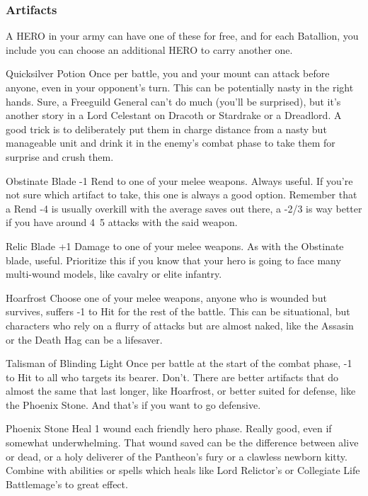 \subsubsection{Artifacts}
A HERO in your army can have one of these for free, and for each Batallion, you
include you can choose an additional HERO to carry another one.

\begin{description}
\item{Quicksilver Potion} Once per battle, you and your mount can attack
    before anyone, even in your opponent's turn. This can be potentially nasty
        in the right hands. Sure, a Freeguild General can't do much (you'll be
        surprised), but it's another story in a Lord Celestant on Dracoth or
        Stardrake or a Dreadlord. A good trick is to deliberately put them in
        charge distance from a nasty but manageable unit and drink it in the
        enemy's combat phase to take them for surprise and crush them.
\item{Obstinate Blade} -1 Rend to one of your melee weapons. Always useful. If
    you're not sure which artifact to take, this one is always a good option.
        Remember that a Rend -4 is usually overkill with the average saves out
        there, a -2/3 is way better if you have around 4~5 attacks with the
        said weapon.
\item{Relic Blade} +1 Damage to one of your melee weapons. As with the
    Obstinate blade, useful. Prioritize this if you know that your hero is
        going to face many multi-wound models, like cavalry or elite infantry.
\item{Hoarfrost} Choose one of your melee weapons, anyone who is wounded but
    survives, suffers -1 to Hit for the rest of the battle. This can be
        situational, but characters who rely on a flurry of attacks but are
        almost naked, like the Assasin or the Death Hag can be a lifesaver.
\item{Talisman of Blinding Light} Once per battle at the start of the combat
    phase, -1 to Hit to all who targets its bearer. Don't. There are better
        artifacts that do almost the same that last longer, like Hoarfrost, or
        better suited for defense, like the Phoenix Stone. And that's if you
        want to go defensive.
\item{Phoenix Stone} Heal 1 wound each friendly hero phase. Really good, even
    if somewhat underwhelming. That wound saved can be the difference between
        alive or dead, or a holy deliverer of the Pantheon's fury or a clawless
        newborn kitty. Combine with abilities or spells which heals like Lord
        Relictor's or Collegiate Life Battlemage's to great effect.
\end{description}

